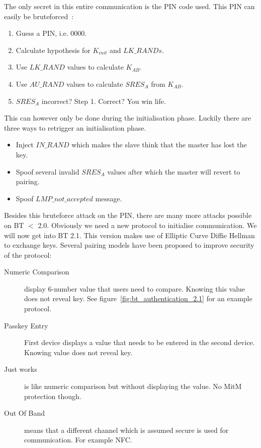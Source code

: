 \documentclass{article}
\begin{document}
The only secret in this entire communication is the PIN code used. This PIN can easily be bruteforced~\cite{shaked2005cracking}:

\begin{enumerate}
\item Guess a PIN, i.e. 0000.
\item Calculate hypothesis for $K_{init}$ and $LK\_RANDs$.
\item Use $LK\_RAND$ values to calculate $K_{AB}$.
\item Use $AU\_RAND$ values to calculate $SRES_A$ from $K_{AB}$.
\item $SRES_A$ incorrect? Step 1. Correct? You win life.
\end{enumerate}

This can however only be done during the initialisation phase. Luckily there are three ways to retrigger an initialisation phase. 

\begin{itemize}
\item Inject $IN\_RAND$ which makes the slave think that the master has lost the key.
\item Spoof several invalid $SRES_A$ values after which the master will revert to pairing.
\item Spoof $LMP\_not\_accepted$ message.
\end{itemize}

Besides this bruteforce attack on the PIN, there are many more attacks possible on BT $<$ 2.0. Obviously we need a new protocol to initialise communication. We will now get into BT 2.1. This version makes use of Elliptic Curve Diffie Hellman to exchange keys. Several pairing models have been proposed to improve security of the protocol:

\begin{description}
\item[Numeric Comparison] display 6-number value that users need to compare. Knowing this value does not reveal key. See figure~\ref{fig:bt_authentication_2.1} for an example protocol. 
\item[Passkey Entry] First device displays a value that needs to be entered in the second device. Knowing value does not reveal key.
\item[Just works] is like numeric comparison but without displaying the value. No MitM protection though.
\item[Out Of Band] means that a different channel which is assumed secure is used for communication. For example NFC.
\end{description}
\end{document}
